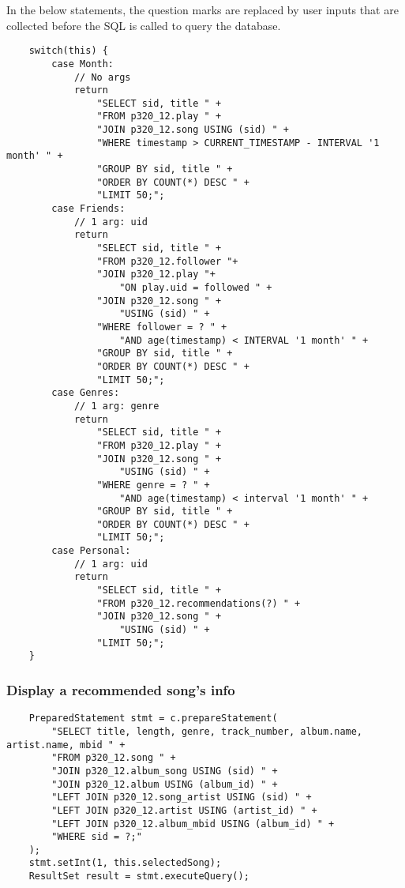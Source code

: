 \documentclass[12pt]{article}
\begin{document}
    \vspace{0.5cm}
    In the below statements, the question marks are replaced by user inputs that are collected
    before the SQL is called to query the database.

    \begin{lstlisting}
    switch(this) {
        case Month:
            // No args
            return
                "SELECT sid, title " +
                "FROM p320_12.play " +
                "JOIN p320_12.song USING (sid) " +
                "WHERE timestamp > CURRENT_TIMESTAMP - INTERVAL '1 month' " +
                "GROUP BY sid, title " +
                "ORDER BY COUNT(*) DESC " +
                "LIMIT 50;";
        case Friends:
            // 1 arg: uid
            return
                "SELECT sid, title " +
                "FROM p320_12.follower "+
                "JOIN p320_12.play "+
                    "ON play.uid = followed " +
                "JOIN p320_12.song " +
                    "USING (sid) " +
                "WHERE follower = ? " +
                    "AND age(timestamp) < INTERVAL '1 month' " +
                "GROUP BY sid, title " +
                "ORDER BY COUNT(*) DESC " +
                "LIMIT 50;";
        case Genres:
            // 1 arg: genre
            return
                "SELECT sid, title " +
                "FROM p320_12.play " +
                "JOIN p320_12.song " +
                    "USING (sid) " +
                "WHERE genre = ? " +
                    "AND age(timestamp) < interval '1 month' " +
                "GROUP BY sid, title " +
                "ORDER BY COUNT(*) DESC " +
                "LIMIT 50;";
        case Personal:
            // 1 arg: uid
            return
                "SELECT sid, title " +
                "FROM p320_12.recommendations(?) " +
                "JOIN p320_12.song " +
                    "USING (sid) " +
                "LIMIT 50;";
    }
    \end{lstlisting}

    \subsubsection{Display a recommended song's info}

    \begin{lstlisting}
    PreparedStatement stmt = c.prepareStatement(
        "SELECT title, length, genre, track_number, album.name, artist.name, mbid " +
        "FROM p320_12.song " +
        "JOIN p320_12.album_song USING (sid) " +
        "JOIN p320_12.album USING (album_id) " +
        "LEFT JOIN p320_12.song_artist USING (sid) " +
        "LEFT JOIN p320_12.artist USING (artist_id) " +
        "LEFT JOIN p320_12.album_mbid USING (album_id) " +
        "WHERE sid = ?;"
    );
    stmt.setInt(1, this.selectedSong);
    ResultSet result = stmt.executeQuery();
    \end{lstlisting}
\end{document}
